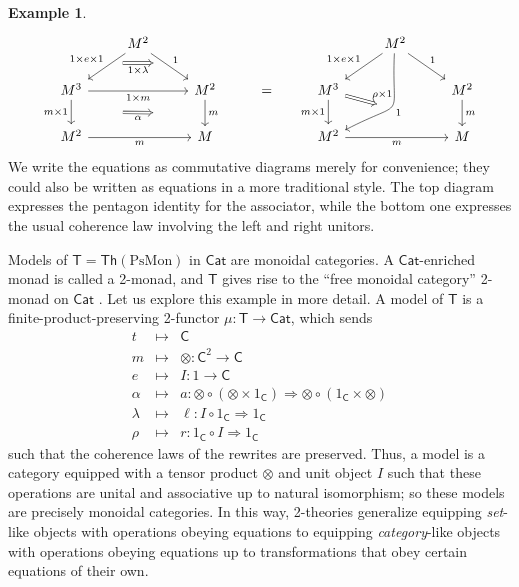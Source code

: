 \documentclass{amsart}
\theoremstyle{definition}
\newtheorem{example}[theorem]{Example}
\newcommand{\Th}{\mathsf{Th}}
\newcommand{\Cat}{\mathsf{Cat}}
\newcommand{\C}{\mathsf{C}}
\newcommand{\T}{\mathsf{T}}
\newcommand{\maps}{\colon}
\begin{document}
\begin{example}
      \[\begin{tikzcd}
          & M^2 \ar[dl,"1\times e\times 1",""name=a1,swap] \ar[dr,"1",""name=a2] \arrow[Rightarrow,from=a1,to=a2,"1\times \lambda",swap,shorten >=0.4cm,shorten <=0.4cm] & && & M^2 \ar[dl,"1\times e\times 1",swap] \ar[dr,"1"] \ar[ddl,bend left =30,looseness=2, "1",""name=c1] & \\
          M^3 \ar[d,"m\times 1",swap,""name=b1] \ar[rr,"1\times m",swap] && M^2 \ar[d,"m",""name=b2] \arrow[Rightarrow,from=b1,to=b2,"\alpha",shorten >=1.3cm,shorten <=1.3cm,swap] & = & M^3 \ar[d,"m\times 1",swap] \arrow[Rightarrow,to=c1,"\rho\times 1",shorten >=0.4cm,shorten <=0.0cm] && M^2 \ar[d,"m"] \\
          M^2 \ar[rr,"m",swap] && M && M^2 \ar[rr,"m",swap] && M
        \end{tikzcd}\]
\noindent We write the equations as commutative diagrams merely for convenience; they could also be written as equations in a more traditional style.   The top diagram expresses the pentagon identity for the associator, while the bottom one expresses the usual coherence law involving the left and right unitors.
   
Models of $\T = \Th(\mathrm{PsMon})$ in $\Cat$ are monoidal categories.   A $\Cat$-enriched monad is called a 2-monad, and $\T$ gives rise to the ``free monoidal category'' 2-monad on $\Cat$ \cite{bkp}.
Let us explore this example in more detail.  A model of $\T$ is a finite-product-preserving 2-functor $\mu\colon \T\to \Cat$, which sends 
\[\begin{array}{rcc}
	t & \mapsto& \C \\
	m & \mapsto & \otimes\maps  \C^2 \to \C \\
	e & \mapsto & I\maps  1\to \C \\
	\alpha & \mapsto & a \maps  \otimes \circ (\otimes \times 1_\C)  \Rightarrow  \otimes \circ (1_\C \times \otimes)\\
	\lambda & \mapsto & \ell \maps  I\circ 1_\C  \Rightarrow  1_\C\\
	\rho & \mapsto & r \maps  1_\C \circ I  \Rightarrow  1_\C
\end{array}\]
such that the coherence laws of the rewrites are preserved.  Thus, a model is a category equipped with a tensor product $\otimes$ and unit object $I$ such that these operations are unital and associative up to natural isomorphism; so these models are precisely monoidal categories. In this way, 2-theories generalize equipping \textit{set}-like objects  with operations obeying equations to equipping \textit{category}-like objects with operations obeying equations up to 
transformations that obey certain equations of their own.


\end{example}
\end{document}
